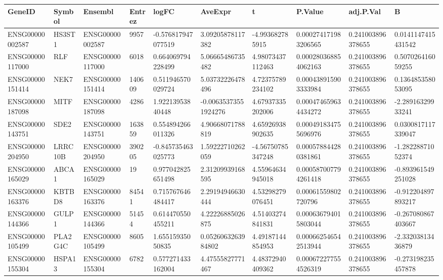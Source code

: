 \begingroup
\tiny
\setlength{\tabcolsep}{2pt}
\renewcommand{\arraystretch}{1.18}
\begin{tabular}{@{}llllllllll@{}}
\toprule
GeneID & Symbol & Ensembl & Entrez & logFC & AveExpr & t & P.Value & adj.P.Val & B \\
\midrule
ENSG00000002587 & HS3ST1 & ENSG00000002587 & 9957 & -0.576817947077519 & 3.09205878117382 & -4.993682785915 & 0.000274171983206565 & 0.241003896378655 & 0.0141147415431542 \\
ENSG00000117000 & RLF & ENSG00000117000 & 6018 & 0.664069794228499 & 5.06665486735482 & 4.98073437112463 & 0.000280368854062163 & 0.241003896378655 & 0.507026416059255 \\
ENSG00000151414 & NEK7 & ENSG00000151414 & 140609 & 0.511946570029724 & 5.03732226478496 & 4.72375789234102 & 0.000438915903333984 & 0.241003896378655 & 0.136485358053095 \\
ENSG00000187098 & MITF & ENSG00000187098 & 4286 & 1.92213953840448 & -0.00635373551924276 & 4.67937335202006 & 0.000474659634434272 & 0.241003896378655 & -2.28916329933241 \\
ENSG00000143751 & SDE2 & ENSG00000143751 & 163859 & 0.554894266011326 & 4.90668071788819 & 4.65926938902635 & 0.000491834755696976 & 0.241003896378655 & 0.0300817117339047 \\
ENSG00000204950 & LRRC10B & ENSG00000204950 & 390205 & -0.845735463025773 & 1.59222710262059 & -4.56750785347248 & 0.000578844280381861 & 0.241003896378655 & -1.28228871052374 \\
ENSG00000165029 & ABCA1 & ENSG00000165029 & 19 & 0.977042825651498 & 2.31209939168595 & 4.55964634945018 & 0.000587007794261418 & 0.241003896378655 & -0.893961549251028 \\
ENSG00000163376 & KBTBD8 & ENSG00000163376 & 84541 & 0.715767646484417 & 2.29194946630444 & 4.53298279076451 & 0.00061559802720796 & 0.241003896378655 & -0.912204897893217 \\
ENSG00000144366 & GULP1 & ENSG00000144366 & 51454 & 0.614470550455211 & 4.22226885026875 & 4.51403274841831 & 0.000636794015803044 & 0.241003896378655 & -0.267080867403667 \\
ENSG00000105499 & PLA2G4C & ENSG00000105499 & 8605 & 1.65515935050835 & 0.0526063263984802 & 4.49187144854953 & 0.000662546542513944 & 0.241003896378655 & -2.33203813436879 \\
ENSG00000155304 & HSPA13 & ENSG00000155304 & 6782 & 0.577271433162004 & 4.47555827771467 & 4.48372940409362 & 0.000672277554526319 & 0.241003896378655 & -0.273198235457878 \\

\end{tabular}
